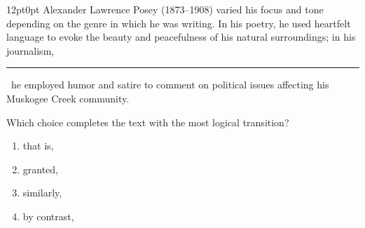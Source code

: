 \documentclass[11pt, twocolumn]{article}
\newcounter{questionnum}
\begin{document}
\vspace{6pt}\noindent
\begin{minipage}{\columnwidth}\raggedright
\noindent{}\par\vspace{8pt}
\begin{adjustwidth}{12pt}{0pt}
Alexander Lawrence Posey (1873--1908) varied his focus and tone depending on the genre in which he was writing. In his poetry, he used heartfelt language to evoke the beauty and peacefulness of his natural surroundings; in his journalism, \,\rule{2cm}{0.4pt}\, he employed humor and satire to comment on political issues affecting his Muskogee Creek community.
\vspace{6pt}

Which choice completes the text with the most logical transition?
\begin{enumerate}[label=\Alph*),leftmargin=18pt,topsep=3pt,itemsep=2pt]
  \item that is,
  \item granted,
  \item similarly,
  \item by contrast,
\end{enumerate}
\end{adjustwidth}
\end{minipage}\par
\end{document}
